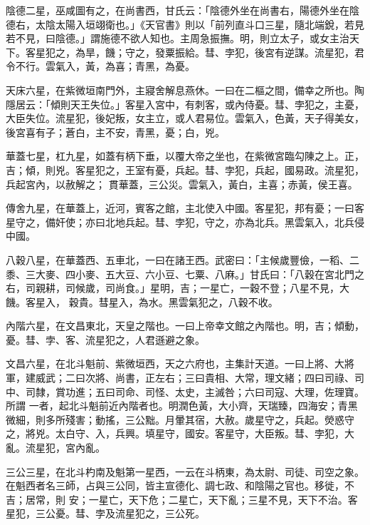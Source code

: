 \begin{pinyinscope}
 陰德二星，巫咸圖有之，在尚書西，甘氏云：「陰德外坐在尚書右，陽德外坐在陰德右，太陰太陽入垣翊衛也。」《天官書》則以「前列直斗口三星，隨北端銳，若見若不見，曰陰德。」謂施德不欲人知也。主周急振撫。明，則立太子，或女主治天下。客星犯之，為旱，饑；守之，發粟振給。彗、孛犯，後宮有逆謀。流星犯，君令不行。雲氣入，黃，為喜；青黑，為憂。



 天床六星，在紫微垣南門外，主寢舍解息燕休。一曰在二樞之間，備幸之所也。陶隱居云：「傾則天王失位。」客星入宮中，有刺客，或內侍憂。彗、孛犯之，主憂，大臣失位。流星犯，後妃叛，女主立，或人君易位。雲氣入，色黃，天子得美女，後宮喜有子；蒼白，主不安，青黑，憂；白，兇。



 華蓋七星，杠九星，如蓋有柄下垂，以覆大帝之坐也，在紫微宮臨勾陳之上。正，吉；傾，則兇。客星犯之，王室有憂，兵起。彗、孛犯，兵起，國易政。流星犯，兵起宮內，以赦解之；
 貫華蓋，三公災。雲氣入，黃白，主喜；赤黃，侯王喜。



 傳舍九星，在華蓋上，近河，賓客之館，主北使入中國。客星犯，邦有憂；一曰客星守之，備奸使；亦曰北地兵起。彗、孛犯，守之，亦為北兵。黑雲氣入，北兵侵中國。



 八穀八星，在華蓋西、五車北，一曰在諸王西。武密曰：「主候歲豐儉，一稻、二黍、三大麥、四小麥、五大豆、六小豆、七粟、八麻。」甘氏曰：「八穀在宮北門之右，司親耕，司候歲，司尚食。」星明，吉；一星亡，一穀不登；八星不見，大饑。客星入，
 穀貴。彗星入，為水。黑雲氣犯之，八穀不收。



 內階六星，在文昌東北，天皇之階也。一曰上帝幸文館之內階也。明，吉；傾動，憂。彗、孛、客、流星犯之，人君遜避之象。



 文昌六星，在北斗魁前、紫微垣西，天之六府也，主集計天道。一曰上將、大將軍，建威武；二曰次將、尚書，正左右；三曰貴相、大常，理文緒；四曰司祿、司中、司隸，賞功進；五曰司命、司怪、太史，主滅咎；六曰司寇、大理，佐理寶。所謂
 一者，起北斗魁前近內階者也。明潤色黃，大小齊，天瑞臻，四海安；青黑微細，則多所殘害；動搖，三公黜。月暈其宿，大赦。歲星守之，兵起。熒惑守之，將兇。太白守、入，兵興。填星守，國安。客星守，大臣叛。彗、孛犯，大亂。流星犯，宮內亂。



 三公三星，在北斗杓南及魁第一星西，一云在斗柄東，為太尉、司徒、司空之象。在魁西者名三師，占與三公同，皆主宣德化、調七政、和陰陽之官也。移徙，不吉；居常，則
 安；一星亡，天下危；二星亡，天下亂；三星不見，天下不治。客星犯，三公憂。彗、孛及流星犯之，三公死。




\end{pinyinscope}
